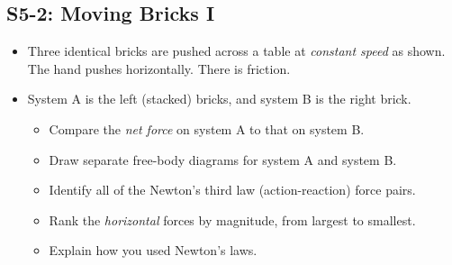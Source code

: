 \documentclass[]{article}
\begin{document}
\begin{PresentSpace}
\vspace{-10pt}
\section*{S5-2: Moving Bricks I}
\vspace{-10pt}
\begin{itemize}
	\item Three identical bricks are pushed across a table at \textit{constant speed} as shown. The hand pushes horizontally. There is friction.
	\begin{center}
	\end{center}
	\item System A is the left (stacked) bricks, and system B is the right brick.
	\begin{itemize}
		\item Compare the \textit{net force} on system A to that on system B.
		\item Draw separate free-body diagrams for system A and system B.
		\item Identify all of the Newton's third law (action-reaction) force pairs.
		\item Rank the \textit{horizontal} forces by magnitude, from largest to smallest.
		\item Explain how you used Newton's laws.
	\end{itemize}
\end{itemize}
\end{PresentSpace}
\newpage
\end{document}
